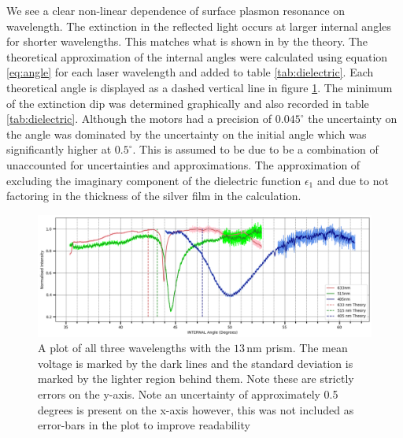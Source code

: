 \documentclass[%
reprint,
amsmath,amssymb,
aps,
]{revtex4-2}
\begin{document}
			We see a clear non-linear dependence of surface plasmon resonance on wavelength. The extinction in the reflected light occurs at larger internal angles for shorter wavelengths. This matches what is shown in by the theory. The theoretical approximation of the internal angles were calculated using equation \ref{eq:angle} for each laser wavelength and added to table \ref{tab:dielectric}. Each theoretical angle is displayed as a dashed vertical line in figure \ref{fig:wavelengthDependence}. The minimum of the extinction dip was determined graphically and also recorded in table \ref{tab:dielectric}. Although the motors had a precision of $0.045^\circ$ the uncertainty on the angle was dominated by the uncertainty on the initial angle which was significantly higher at $0.5^\circ$. This is assumed to be due to be a combination of unaccounted for uncertainties and approximations. The approximation of excluding the imaginary component of the dielectric function $\epsilon_1$ and due to not factoring in the thickness of the silver film in the calculation.
			
			\begin{figure}
				\includegraphics[width=1.5\columnwidth]{wavelengthDependence.png}
				\caption{\label{fig:wavelengthDependence}A plot of all three wavelengths with the $13\,\text{nm}$ prism. The mean voltage is marked by the dark lines and the standard deviation is marked by the lighter region behind them. Note these are strictly errors on the y-axis. Note an uncertainty of approximately 0.5 degrees is present on the x-axis however, this was not included as error-bars in the plot to improve readability}
			\end{figure}
			
\end{document}
